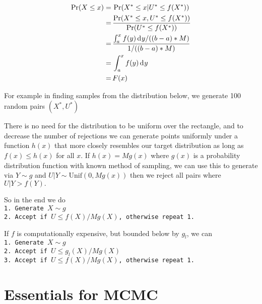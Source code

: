 \begin{align*}
    \Pr(X \leq x) =\, & \Pr(X^* \leq x|U^*\leq f(X^*))                              \\
    =\,               & \frac{\Pr(X^* \leq x, U^*\leq f(X^*))}{\Pr(U^*\leq f(X^*))} \\
    =\,               & \frac{\int_a^xf(y)\diff y/((b - a)*M)}{1/((b - a)*M)}       \\
    =\,               & \int_a^xf(y)\diff y                                         \\
    =\,               & F(x)
\end{align*}

For example in finding samples from the distribution below, we generate 100 random pairs $(X^*, U^*)$



There is no need for the distribution to be uniform over the rectangle, and to decrease the number of rejections we can generate points uniformly under a function $h(x)$ that more closely resembles our target distribution as long as $f(x)\leq h(x)$ for all $x$. If $h(x) = Mg(x)$ where $g(x)$ is a probability distribution function with known method of sampling, we can use this to generate via $Y\sim g$ and $U|Y\sim \mathrm{Unif}(0, Mg(x))$ then we reject all pairs where $U|Y>f(Y).$

So in the end we do\texttt{\\
    1. Generate $X\sim g$\\
    2. Accept if $U\leq f(X)/Mg(X)$, otherwise repeat 1.}

If $f$ is computationally expensive, but bounded below by $g_l$, we can \texttt{\\
    1. Generate $X\sim g$\\
    2. Accept if $U\leq g_l(X)/Mg(X)$\\
    3. Accept if $U\leq f(X)/Mg(X)$, otherwise repeat 1.}

\section{Essentials for MCMC}\label{Markov_chains}


